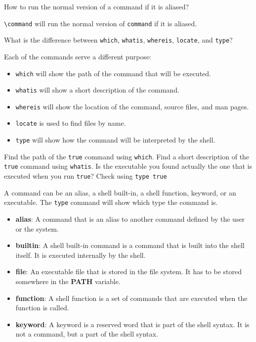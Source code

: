 \begin{qs}
  How to run the normal version of a command if it is aliased?
\end{qs}

\begin{ans}
  \texttt{\textbackslash command} will run the normal version of \texttt{command} if it is aliased.
\end{ans}

\begin{qs}
  What is the difference between \texttt{which}, \texttt{whatis}, \texttt{whereis}, \texttt{locate}, and \texttt{type}?
\end{qs}

\begin{ans}
  Each of the commands serve a different purpose:
  \begin{itemize}
    \item \texttt{which} will show the path of the command that will be executed.
    \item \texttt{whatis} will show a short description of the command.
    \item \texttt{whereis} will show the location of the command, source files, and man pages.
    \item \texttt{locate} is used to find files by name.
    \item \texttt{type} will show how the command will be interpreted by the shell.
  \end{itemize}
\end{ans}

\begin{exercise}
  Find the path of the \texttt{true} command using \texttt{which}.
  Find a short description of the \texttt{true} command using \texttt{whatis}.
  Is the executable you found actually the one that is executed when you run \texttt{true}? Check using \texttt{type true}
\end{exercise}

\begin{definition}
  A command can be an alias, a shell built-in, a shell function, keyword, or an executable.
  The \texttt{type} command will show which type the command is.
  \begin{itemize}
    \item \textbf{alias}: A command that is an alias to another command defined
    by the user or the system.
    \item \textbf{builtin}: A shell built-in command is a command that is built
    into the shell itself. It is executed internally by the shell.
    \item \textbf{file}: An executable file that is stored in the file system.
      It has to be stored somewhere in the \textbf{PATH} variable.
    \item \textbf{function}: A shell function is a set of commands that are
    executed when the function is called.
    \item \textbf{keyword}: A keyword is a reserved word that is part of the shell
    syntax. It is not a command, but a part of the shell syntax.
  \end{itemize}
\end{definition}

